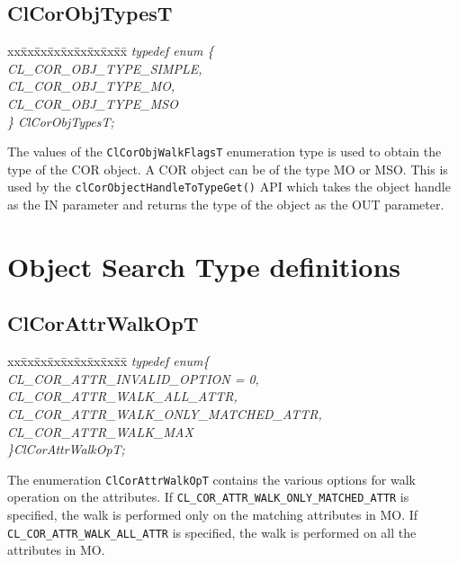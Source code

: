 \begin{flushleft}
\subsection{ClCorObjTypesT}
\begin{tabbing}
xx\=xx\=xx\=xx\=xx\=xx\=xx\=xx\=xx\=\kill
\textit{typedef enum \{}\\
\>\>\>\>\textit{CL\_COR\_OBJ\_TYPE\_SIMPLE,}\\
\>\>\>\>\textit{CL\_COR\_OBJ\_TYPE\_MO,}\\
\>\>\>\>\textit{CL\_COR\_OBJ\_TYPE\_MSO}\\
\textit{\} ClCorObjTypesT;}\end{tabbing}
The values of the {\tt{ClCorObjWalkFlagsT}} enumeration type is used to obtain the type of the COR object. A COR object can be of the type MO or MSO.
This is used by the {\tt{clCorObjectHandleToTypeGet()}} API which takes the object handle as the IN parameter and returns the type of the object as 
the OUT parameter.



\section{Object Search Type definitions}
 \subsection{ClCorAttrWalkOpT}
	    \begin{tabbing}
xx\=xx\=xx\=xx\=xx\=xx\=xx\=xx\=xx\=\kill
\textit{typedef enum\{}\\
	           \>\>\>\>\textit{CL\_COR\_ATTR\_INVALID\_OPTION = 0,}\\
	                 \>\>\>\>\textit{CL\_COR\_ATTR\_WALK\_ALL\_ATTR,}\\
	                 \>\>\>\>\textit{CL\_COR\_ATTR\_WALK\_ONLY\_MATCHED\_ATTR,}\\
	                 \>\>\>\>\textit{CL\_COR\_ATTR\_WALK\_MAX}\\
           \textit{\}ClCorAttrWalkOpT;}\end{tabbing}
The enumeration {\tt{ClCorAttrWalkOpT}} contains the various options for walk operation on the attributes.
If {\tt{CL\_\-COR\_\-ATTR\_\-WALK\_\-ONLY\_\-MATCHED\_\-ATTR}} is specified, the walk is performed only on the matching attributes in MO. If 
{\tt{CL\_\-COR\_\-ATTR\_\-WALK\_\-ALL\_\-ATTR}} is specified, the walk is performed on all the attributes in MO.





\end{flushleft}
